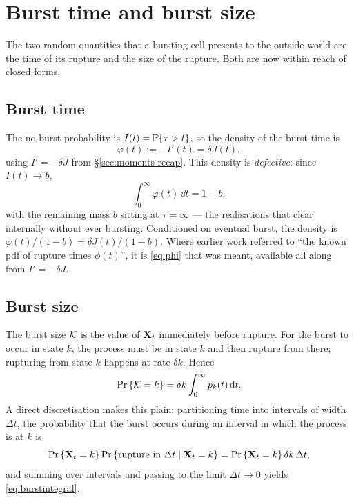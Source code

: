 \section{Burst time and burst size}
\label{sec:burst-time-size}

The two random quantities that a bursting cell presents to the outside world
are the time of its rupture and the size of the rupture. Both are now within
reach of closed forms.

\subsection{Burst time}
\label{sec:burst-time}

The no-burst probability is $I(t)=\mathbb{P}\!\left\{\tau>t\right\}$, so the density of the
burst time is
\begin{equation}
\varphi(t):=-I'(t)=\delta J(t),
\label{eq:phi}
\end{equation}
using $I'=-\delta J$ from \S\ref{sec:moments-recap}. This density is
\emph{defective}: since $I(t)\to b$,
\begin{equation}
\int_0^\infty\varphi(t)\,\dd t=1-b,
\end{equation}
with the remaining mass $b$ sitting at $\tau=\infty$ --- the realisations
that clear internally without ever bursting. Conditioned on eventual burst,
the density is $\varphi(t)/(1-b)=\delta J(t)/(1-b)$. Where earlier work
referred to ``the known pdf of rupture times $\phi(t)$'', it is
\eqref{eq:phi} that was meant, available all along from $I'=-\delta J$.

\subsection{Burst size}
\label{sec:burst-size}

The burst size $\mathcal{K}$ is the value of ${{\bf X}_t}$ immediately before rupture. For
the burst to occur in state $k$, the process must be in state $k$ and then
rupture from there; rupturing from state $k$ happens at rate $\delta k$.
Hence
\begin{equation}
{\text{Pr}\left\{\mathcal{K}= k\right\}} = \delta k \int_0^\infty p_k(t)\,{\rm d} t.
\label{eq:burstintegral}
\end{equation}
A direct discretisation makes this plain: partitioning time into intervals
of width $\Delta t$, the probability that the burst occurs during an interval
in which the process is at $k$ is
$$
{\text{Pr}\left\{{{\bf X}_t}=k\right\}}\,{\text{Pr}\left\{\text{rupture in }\Delta t\mid{{\bf X}_t}=k\right\}}
={\text{Pr}\left\{{{\bf X}_t}=k\right\}}\,\delta k\,\Delta t,
$$
and summing over intervals and passing to the limit $\Delta t\to0$ yields
\eqref{eq:burstintegral}.

